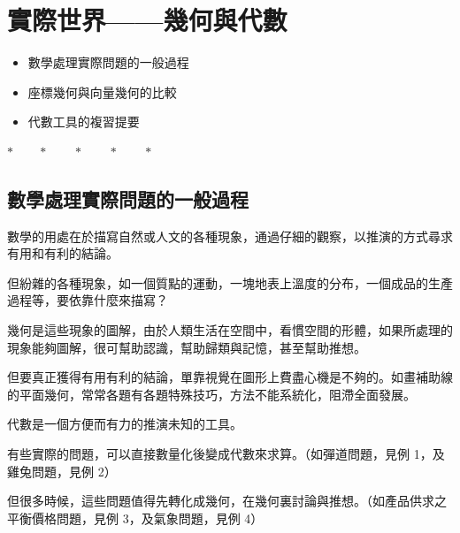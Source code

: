 
\section{實際世界——幾何與代數}
\label{sec:b3s-ch1}

\begin{center}
\begin{minipage}{0.65\textwidth}
\begin{itemize}[leftmargin=2em, itemsep=0.3em]
  \item[§1-1] 數學處理實際問題的一般過程
  \item[§1-2] 座標幾何與向量幾何的比較
  \item[§1-3] 代數工具的複習提要
\end{itemize}
\end{minipage}
\end{center}

\begin{center}
$* \qquad * \qquad * \qquad * \qquad *$
\end{center}

\subsection{數學處理實際問題的一般過程}
\label{subsec:b3s-1-1}

數學的用處在於描寫自然或人文的各種現象，通過仔細的觀察，以推演的方式尋求有用和有利的結論。

但紛雜的各種現象，如一個質點的運動，一塊地表上溫度的分布，一個成品的生產過程等，要依靠什麼來描寫？

幾何是這些現象的圖解，由於人類生活在空間中，看慣空間的形體，如果所處理的現象能夠圖解，很可幫助認識，幫助歸類與記憶，甚至幫助推想。

但要真正獲得有用有利的結論，單靠視覺在圖形上費盡心機是不夠的。如畫補助線的平面幾何，常常各題有各題特殊技巧，方法不能系統化，阻滯全面發展。

代數是一個方便而有力的推演未知的工具。

有些實際的問題，可以直接數量化後變成代數來求算。（如彈道問題，見例 1，及雞兔問題，見例 2）

但很多時候，這些問題值得先轉化成幾何，在幾何裏討論與推想。（如產品供求之平衡價格問題，見例 3，及氣象問題，見例 4）

